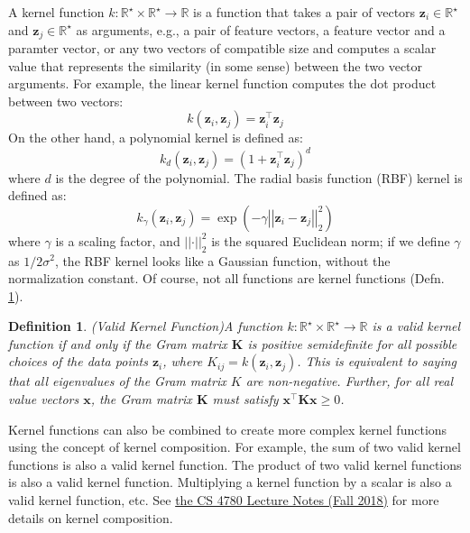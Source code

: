 \documentclass{article}[11pt]
\newtheorem{defn}{Definition}
\def\R{\mathbb{R}}
\newcommand{\norm}[1]{\left|\left|#1\right|\right|}
\begin{document}
A kernel function $k:\mathbb{R}^{\star}\times\R^{\star}\to\R$ is a function that takes a pair of vectors 
$\mathbf{z}_i\in\R^{\star}$ and $\mathbf{z}_j\in\R^{\star}$ as arguments, 
e.g., a pair of feature vectors, a feature vector and a paramter vector, or any two vectors of compatible size 
and computes a scalar value that represents the similarity (in some sense) between the two vector arguments.
For example, the linear kernel function computes the dot product between two vectors:
\begin{equation}
k(\mathbf{z}_i, \mathbf{z}_j) = \mathbf{z}_i^{\top}\mathbf{z}_j
\end{equation}
On the other hand, a polynomial kernel is defined as:
\begin{equation}
k_{d}(\mathbf{z}_i, \mathbf{z}_j) = (1+\mathbf{z}_i^{\top}\mathbf{z}_j)^d
\end{equation}
where $d$ is the degree of the polynomial. The radial basis function (RBF) kernel is defined as:
\begin{equation}
k_{\gamma}(\mathbf{z}_i, \mathbf{z}_j) = \exp(-\gamma \norm{\mathbf{z}_i - \mathbf{z}_j}_{2}^2)
\end{equation}
where $\gamma$ is a scaling factor, and $\norm{\cdot}^{2}_{2}$ is the squared Euclidean norm;
if we define $\gamma$ as ${1}/{2\sigma^2}$, the RBF kernel looks like a Gaussian function, without the normalization constant.
Of course, not all functions are kernel functions (Defn. \ref{def:kernel-valid}).
\begin{defn}{(Valid Kernel Function)}\label{def:kernel-valid}
A function $k:\mathbb{R}^{\star}\times\R^{\star}\to\R$ is a valid kernel function if and only if the Gram matrix $\mathbf{K}$ is positive 
semidefinite for all possible choices of the data points $\mathbf{z}_i$, where $K_{ij} = k(\mathbf{z}_i, \mathbf{z}_j)$.
This is equivalent to saying that all eigenvalues of the Gram matrix $K$ are non-negative.
Further, for all real value vectors $\mathbf{x}$, the Gram matrix $\mathbf{K}$ must satisfy $\mathbf{x}^{\top}\mathbf{K}\mathbf{x} \geq 0$.
\end{defn}
Kernel functions can also be combined to create more complex kernel functions using the concept of kernel composition.
For example, the sum of two valid kernel functions is also a valid kernel function. 
The product of two valid kernel functions is also a valid kernel function. 
Multiplying a kernel function by a scalar is also a valid kernel function, etc.
See \href{https://www.cs.cornell.edu/courses/cs4780/2018fa/lectures/lecturenote14.html}{the CS 4780 Lecture Notes (Fall 2018)} for more details on kernel composition.
\end{document}
